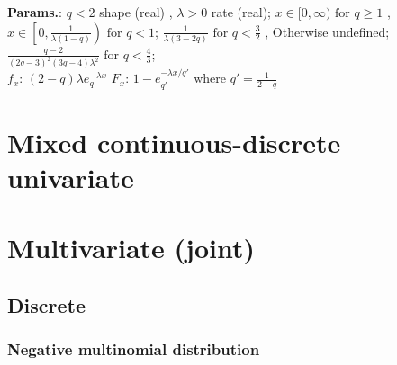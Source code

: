     {\color{darkblue} \textbf{Params.}:} {$q < 2 $ shape (real) ,  $ \lambda > 0 $ rate (real)}; {$x \in [0, \infty) \text{ for } q \ge 1 $ ,  $ x \in \left[0, \frac{1}{\lambda(1-q)}\right) \text{ for } q<1 $}; {$\frac{1}{\lambda (3-2q)} \text{ for } q < \frac{3}{2} $ ,  Otherwise undefined}; {$\frac{q-2}{(2q-3)^2 (3q-4) \lambda^2} \text{ for } q < \frac{4}{3}$};\hspace{0.5cm}\\{\color{darkblue} \textbf{$f_x$}:} {$(2-q) \lambda e_q^{-\lambda x} $}{\color{darkblue} \textbf{$F_x$}:} {$1-e_{q'}^{-\lambda x / q'} \text{ where } q' = \frac{1}{2-q}$}



    


    \section{Mixed continuous-discrete univariate }
        

        
    


    \section{Multivariate (joint)}
        
            \subsection{Discrete}

            
    
        
\subsubsection{Negative multinomial distribution}





